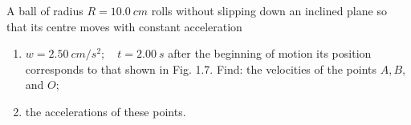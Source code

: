 
\item A ball of radius \( R = 10.0\ cm \) rolls without slipping down an inclined plane so that its centre moves with constant acceleration
    \begin{center}
    \end{center}
    \begin{enumerate}
        \item \( w = 2.50\ cm/s^2; \quad t = 2.00\ s \) after the beginning of motion its position corresponds to that shown in Fig. 1.7. Find: the velocities of the points \( A, B, \) and \( O; \)
        \item the accelerations of these points.
    \end{enumerate}
